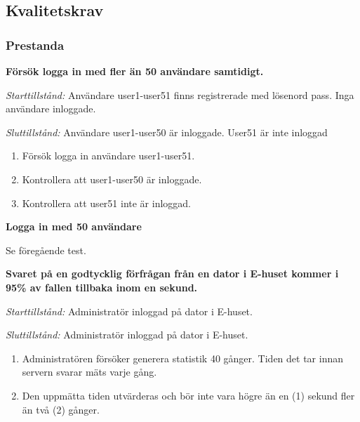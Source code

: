 \documentclass[a4paper]{article}
\begin{document}




\subsection{Kvalitetskrav}

\subsubsection{Prestanda}

\begin{ST}
\item
\textbf{Försök logga in med fler än 50 användare samtidigt.}

\emph{Starttillstånd:} Användare user1-user51 finns registrerade med lösenord pass. Inga användare inloggade.

\emph{Sluttillstånd:} Användare user1-user50 är inloggade. User51 är inte inloggad

\begin{enumerate}

\item
Försök logga in användare user1-user51.
\item
Kontrollera att user1-user50 är inloggade.
\item
Kontrollera att user51 inte är inloggad.
\end{enumerate}

\item
\textbf{Logga in med 50 användare}

Se föregående test.

\item
\textbf{Svaret på en godtycklig förfrågan från en dator i E-huset kommer i 95\% av fallen tillbaka
inom en sekund.}

\emph{Starttillstånd:} Administratör inloggad på dator i E-huset.

\emph{Sluttillstånd:} Administratör inloggad på dator i E-huset.

\begin{enumerate}

\item Administratören försöker generera statistik 40 gånger. Tiden det tar innan servern svarar mäts varje gång.

\item Den uppmätta tiden utvärderas och bör inte vara högre än en (1) sekund fler än två (2) gånger.


\end{enumerate}

\end{ST}
\end{document}
